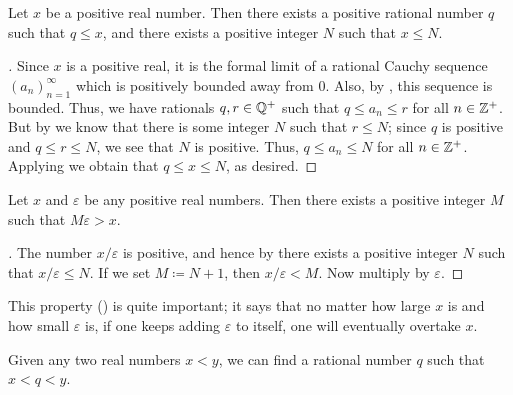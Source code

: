 \begin{prop}\label{i:5.4.12}
  Let \(x\) be a positive real number.
  Then there exists a positive rational number \(q\) such that \(q \leq x\), and there exists a positive integer \(N\) such that \(x \leq N\).
\end{prop}

\begin{proof}[]
  Since \(x\) is a positive real, it is the formal limit of a rational Cauchy sequence \((a_n)_{n = 1}^{\infty}\) which is positively bounded away from \(0\).
  Also, by , this sequence is bounded.
  Thus, we have rationals \(q, r \in \mathbb{Q}^+\) such that \(q \leq a_n \leq r\) for all \(n \in \mathbb{Z}^+\).
  But by  we know that there is some integer \(N\) such that \(r \leq N\);
  since \(q\) is positive and \(q \leq r \leq N\), we see that \(N\) is positive.
  Thus, \(q \leq a_n \leq N\) for all \(n \in \mathbb{Z}^+\).
  Applying  we obtain that \(q \leq x \leq N\), as desired.
\end{proof}

\begin{cor}\label{i:5.4.13}
  Let \(x\) and \(\varepsilon\) be any positive real numbers.
  Then there exists a positive integer \(M\) such that \(M\varepsilon > x\).
\end{cor}

\begin{proof}[]
  The number \(x / \varepsilon\) is positive, and hence by  there exists a positive integer \(N\) such that \(x / \varepsilon \leq N\).
  If we set \(M \coloneqq N + 1\), then \(x / \varepsilon < M\).
  Now multiply by \(\varepsilon\).
\end{proof}

\begin{note}
  This property () is quite important;
  it says that no matter how large \(x\) is and how small \(\varepsilon\) is, if one keeps adding \(\varepsilon\) to itself, one will eventually overtake \(x\).
\end{note}

\begin{prop}\label{i:5.4.14}
  Given any two real numbers \(x < y\), we can find a rational number \(q\) such that \(x < q < y\).
\end{prop}

